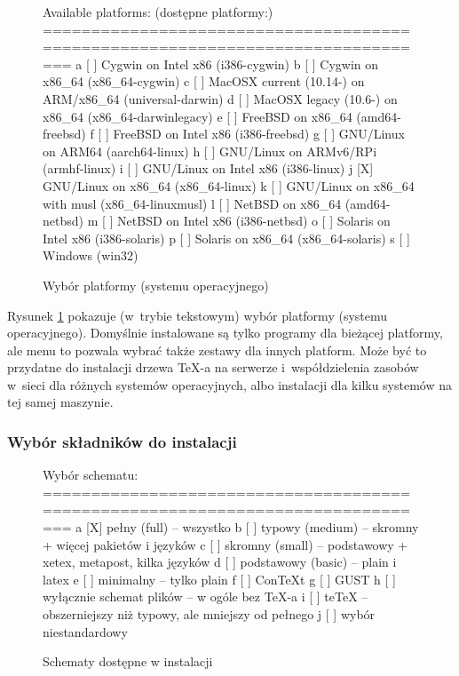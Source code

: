 \documentclass{article}
\begin{document}
\begin{figure}[tb]
\begin{boxedverbatim}
Available platforms: (dostępne platformy:)
===============================================================================
   a [ ] Cygwin on Intel x86 (i386-cygwin)
   b [ ] Cygwin on x86_64 (x86_64-cygwin)
   c [ ] MacOSX current (10.14-) on ARM/x86_64 (universal-darwin)
   d [ ] MacOSX legacy (10.6-) on x86_64 (x86_64-darwinlegacy)
   e [ ] FreeBSD on x86_64 (amd64-freebsd)
   f [ ] FreeBSD on Intel x86 (i386-freebsd)
   g [ ] GNU/Linux on ARM64 (aarch64-linux)
   h [ ] GNU/Linux on ARMv6/RPi (armhf-linux)
   i [ ] GNU/Linux on Intel x86 (i386-linux)
   j [X] GNU/Linux on x86_64 (x86_64-linux)
   k [ ] GNU/Linux on x86_64 with musl (x86_64-linuxmusl)
   l [ ] NetBSD on x86_64 (amd64-netbsd)
   m [ ] NetBSD on Intel x86 (i386-netbsd)
   o [ ] Solaris on Intel x86 (i386-solaris)
   p [ ] Solaris on x86_64 (x86_64-solaris)
   s [ ] Windows (win32)
\end{boxedverbatim}
\caption{Wybór platformy (systemu operacyjnego)}\label{fig:bin-text}
\end{figure}

Rysunek \ref{fig:bin-text} pokazuje (w~trybie tekstowym) wybór platformy
(systemu operacyjnego).  Domyślnie instalowane są tylko programy dla bieżącej
platformy, ale menu to pozwala wybrać także  zestawy dla innych platform. Może
być to przydatne do instalacji drzewa \TeX-a na serwerze i~współdzielenia zasobów w~sieci
dla różnych systemów operacyjnych, albo instalacji dla kilku systemów na
tej samej maszynie.

\subsubsection{Wybór składników do instalacji}
\label{sec:components}

\begin{figure}[tbh]
\begin{boxedverbatim}
Wybór schematu:
===============================================================================
a [X] pełny (full) -- wszystko
b [ ] typowy (medium) -- skromny + więcej pakietów i języków
c [ ] skromny (small) -- podstawowy + xetex, metapost, kilka języków
d [ ] podstawowy (basic) -- plain i latex
e [ ] minimalny --  tylko plain
f [ ] ConTeXt
g [ ] GUST
h [ ] wyłącznie schemat plików -- w ogóle bez  TeX-a
i [ ] teTeX  -- obszerniejszy niż typowy, ale mniejszy od pełnego
j [ ] wybór niestandardowy
\end{boxedverbatim}
\caption{Schematy dostępne w instalacji}\label{fig:scheme-text}
\end{figure}
\end{document}
